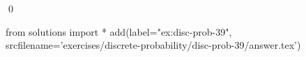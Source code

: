 
\begin{ex} 
  \label{ex:disc-prob-39}
  
  \qed
\end{ex} 
\begin{python0}
from solutions import *
add(label="ex:disc-prob-39",
    srcfilename='exercises/discrete-probability/disc-prob-39/answer.tex') 
\end{python0}
